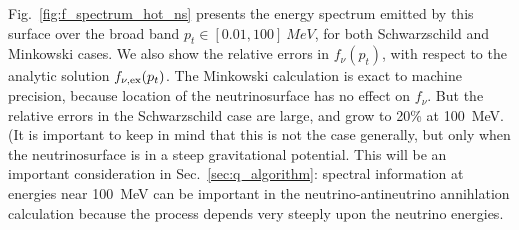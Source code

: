 Fig.~\ref{fig:f_spectrum_hot_ns} presents the energy spectrum emitted by this
surface over the broad band $p_t\in[0.01,100]~MeV$, for both Schwarzschild
and Minkowski cases.
We also show the relative errors in $f_\nu(p_t)$, with respect to the analytic
solution $f_{\nu,\rm ex}(p_t)$. The Minkowski calculation is exact to machine
precision, because location of the neutrinosurface has no effect on $f_\nu$.
But the relative errors in the Schwarzschild case are large, and grow to
20\% at 100~MeV. (It is important to keep in mind that this is not the case
generally, but only when the neutrinosurface is in a steep gravitational
potential.
This will be an important consideration in Sec.~\ref{sec:q_algorithm}:
spectral information at energies near 100~MeV can be important in the
neutrino-antineutrino annihlation calculation because the process depends very
steeply upon the neutrino energies.

